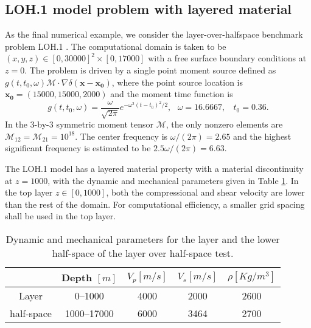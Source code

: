 \subsection{LOH.1 model problem with layered material}
As the final numerical example, we consider the layer-over-halfspace benchmark problem LOH.1 \cite{Day2001}. The computational domain is taken to be $(x,y,z)\in[0,30000]^2\times[0,17000]$ with a free surface boundary conditions at $z=0$.   The problem is driven by a single point moment source defined as 
$g(t,t_0,\omega) \mathcal{M} \cdot \nabla\delta (\mathbf{x}-\mathbf{x_0})$, 
where the point source location is $\mathbf{x_0}= (15000, 15000, 2000)$  and the moment time function is
\[g(t,t_0,\omega) = \frac{\omega}{\sqrt{2\pi}}e^{-\omega^2(t - t_0)^2/2}, \ \ \ \omega = 16.6667,\ \ \ \ t_0 = 0.36.\]
In the 3-by-3 symmetric moment tensor $\mathcal{M}$, the only nonzero elements are $\mathcal{M}_{12}=\mathcal{M}_{21}=10^{18}$. The center frequency is ${\omega}/{(2\pi)}=2.65$ and the highest significant frequency is estimated to be $2.5{\omega}/{(2\pi)}=6.63$.

The LOH.1 model has a layered material property with a material discontinuity at $z=1000$, with the dynamic and mechanical parameters given in Table \ref{material_parameter}. In the top layer $z\in [0, 1000]$, both the compressional and shear velocity are lower than the rest of the domain. For computational efficiency, a smaller grid spacing shall be used in the top layer. 

\begin{table}[htbp]
	\begin{center}
		\begin{tabular}{c c c c c}
			\hline
			~   & Depth $[m]$& $V_p[m/s]$ & $V_s [m/s]$ & $\rho[Kg/m^3]$ \\
			\hline
			Layer&0--1000& 4000& 2000& 2600\\
			half-space &1000--17000 & 6000 & 3464& 2700\\
			\hline 
		\end{tabular}
	\end{center}
	\caption{Dynamic and mechanical parameters for the layer and the lower half-space of the layer over half-space test.}\label{material_parameter}
\end{table} 

